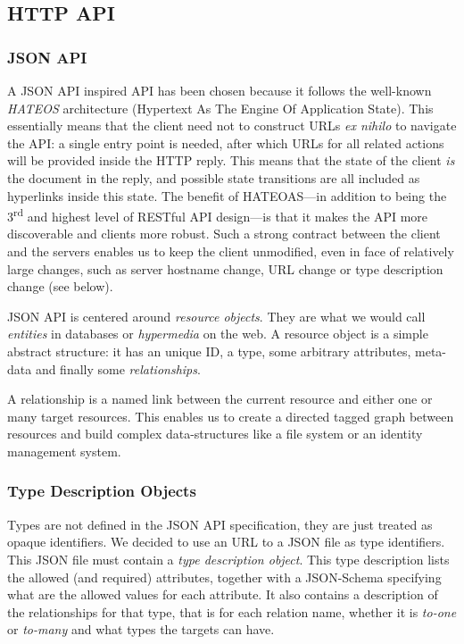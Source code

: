\documentclass[a4paper, english]{report}
\begin{document}
\subsection{HTTP API}
\subsubsection{JSON API}
A JSON API inspired API has been chosen because it follows the well-known \emph{HATEOS} architecture (Hypertext As The Engine Of Application State). This essentially means that the client need not to construct URLs \emph{ex nihilo} to navigate the API: a single entry point is needed, after which URLs for all related actions will be provided inside the HTTP reply. This means that the state of the client \emph{is} the document in the reply, and possible state transitions are all included as hyperlinks inside this state. The benefit of HATEOAS---in addition to being the 3\textsuperscript{rd} and highest level of RESTful API design---is that it makes the API more discoverable and clients more robust. Such a strong contract between the client and the servers enables us to keep the client unmodified, even in face of relatively large changes, such as server hostname change, URL change or type description change (see below).

JSON API is centered around \emph{resource objects}. They are what we would call \emph{entities} in databases or \emph{hypermedia} on the web. A resource object is a simple abstract structure: it has an unique ID, a type, some arbitrary attributes, meta-data and finally some \emph{relationships}.

A relationship is a named link between the current resource and either one or many target resources. This enables us to create a directed tagged graph between resources and build complex data-structures like a file system or an identity management system.

\subsubsection{Type Description Objects}
Types are not defined in the JSON API specification, they are just treated as opaque identifiers. We decided to use an URL to a JSON file as type identifiers. This JSON file must contain a \emph{type description object}. This type description lists the allowed (and required) attributes, together with a JSON-Schema\cite{jsonschema} specifying what are the allowed values for each attribute. It also contains a description of the relationships for that type, that is for each relation name, whether it is \emph{to-one} or \emph{to-many} and what types the targets can have.
\end{document}
